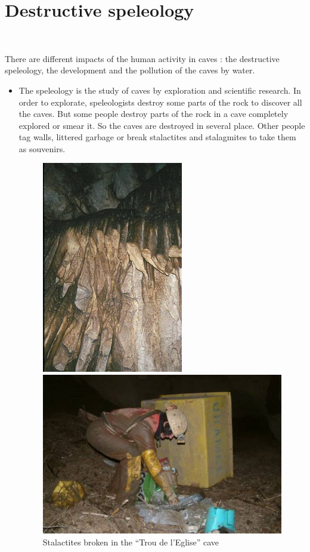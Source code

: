 \documentclass[draft, final]{report}
\begin{document}
\chapter{Destructive speleology}
~\par
There are different impacts of the human activity in caves : the destructive speleology, the development and the pollution of the caves by water.
\begin{itemize}
  \item The speleology is the study of caves by exploration and scientific research. In order to explorate, speleologists destroy some parts of the rock to discover all the caves. But some people destroy parts of the rock in a cave completely explored or smear it. So the caves are destroyed in several place. Other people tag walls, littered garbage or break stalactites and stalagmites to take them as souvenirs.
  \begin{figure}[!ht]
      \begin{minipage}[c]{.46\linewidth}
          \centering
          \includegraphics[scale=10]{LateX/Images/brokenstalactite.jpg}
          \caption{Stalactites broken in  the ``Trou de l'Eglise'' cave\cite{brokenstalactite}}
      \end{minipage}
      \hfill%
      \begin{minipage}[c]{.46\linewidth}
          \centering
          \includegraphics[scale=0.6]{LateX/Images/garbageincaves.jpg}

\end{minipage}
\end{figure}
\end{itemize}
\end{document}
